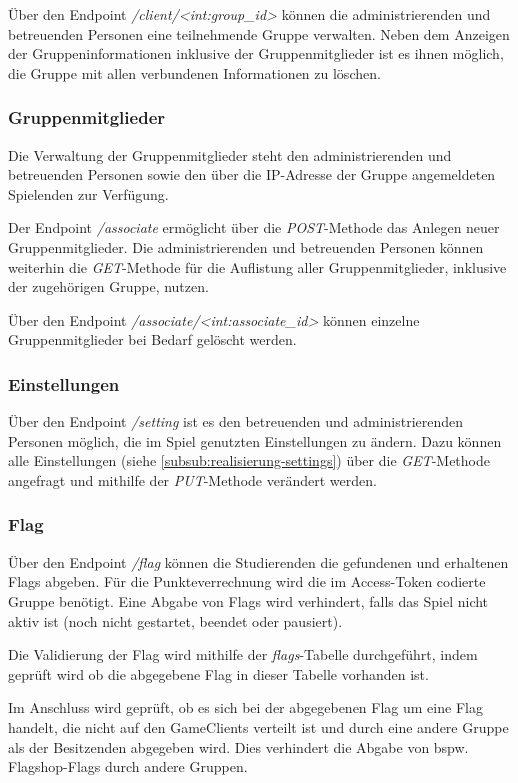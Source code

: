 Über den Endpoint \textit{/client/<int:group\_id>} können die administrierenden und betreuenden Personen eine teilnehmende Gruppe verwalten. Neben dem Anzeigen der Gruppeninformationen inklusive der Gruppenmitglieder ist es ihnen möglich, die Gruppe mit allen verbundenen Informationen zu löschen.

\subsubsection{Gruppenmitglieder}
Die Verwaltung der Gruppenmitglieder steht den administrierenden und betreuenden Personen sowie den über die IP-Adresse der Gruppe angemeldeten Spielenden zur Verfügung.

Der Endpoint \textit{/associate} ermöglicht über die \textit{POST}-Methode das Anlegen neuer Gruppenmitglieder. Die administrierenden und betreuenden Personen können weiterhin die \textit{GET}-Methode für die Auflistung aller Gruppenmitglieder, inklusive der zugehörigen Gruppe, nutzen.

Über den Endpoint \textit{/associate/<int:associate\_id>} können einzelne Gruppenmitglieder bei Bedarf gelöscht werden.

\subsubsection{Einstellungen}
Über den Endpoint \textit{/setting} ist es den betreuenden und administrierenden Personen möglich, die im Spiel genutzten Einstellungen zu ändern. Dazu können alle Einstellungen (siehe \autoref{subsub:realisierung-settings}) über die \textit{GET}-Methode angefragt und mithilfe der \textit{PUT}-Methode verändert werden.

\subsubsection{Flag}
Über den Endpoint \textit{/flag} können die Studierenden die gefundenen und erhaltenen Flags abgeben. Für die Punkteverrechnung wird die im Access-Token codierte Gruppe benötigt. Eine Abgabe von Flags wird verhindert, falls das Spiel nicht aktiv ist (noch nicht gestartet, beendet oder pausiert).

Die Validierung der Flag wird mithilfe der \textit{flags}-Tabelle durchgeführt, indem geprüft wird ob die abgegebene Flag in dieser Tabelle vorhanden ist.

Im Anschluss wird geprüft, ob es sich bei der abgegebenen Flag um eine Flag handelt, die nicht auf den GameClients verteilt ist und durch eine andere Gruppe als der Besitzenden abgegeben wird. Dies verhindert die Abgabe von bspw. Flagshop-Flags durch andere Gruppen. 

